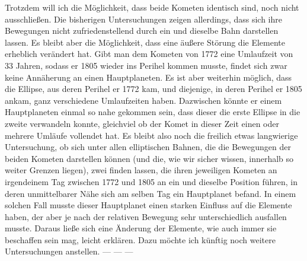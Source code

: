 \par\indent Trotzdem will ich die Möglichkeit, dass beide Kometen identisch sind, noch nicht ausschließen. Die bisherigen Untersuchungen zeigen allerdings, dass sich ihre Bewegungen nicht zufriedenstellend durch ein und dieselbe Bahn darstellen lassen. Es bleibt aber die Möglichkeit, dass eine äußere Störung die Elemente erheblich verändert hat. Gibt man dem Kometen von 1772 eine Umlaufzeit von 33 Jahren, sodass er 1805 wieder ins Perihel kommen musste, findet sich zwar keine Annäherung an einen Hauptplaneten. Es ist aber weiterhin möglich, dass die Ellipse, aus deren Perihel er 1772 kam, und diejenige, in deren Perihel er 1805 ankam, ganz verschiedene Umlaufzeiten haben. Dazwischen könnte er einem Hauptplaneten einmal so nahe gekommen sein, dass dieser die erste Ellipse in die zweite verwandeln konnte, gleichviel ob der Komet in dieser Zeit einen oder mehrere Umläufe vollendet hat. Es bleibt also noch die freilich etwas langwierige Untersuchung, ob sich unter allen elliptischen Bahnen, die die Bewegungen der beiden Kometen darstellen können (und die, wie wir sicher wissen, innerhalb so weiter Grenzen liegen), zwei finden lassen, die ihren jeweiligen Kometen an irgendeinem Tag zwischen 1772 und 1805 an ein und dieselbe Position führen, in deren unmittelbarer Nähe sich am selben Tag ein Hauptplanet befand. In einem solchen Fall musste dieser Hauptplanet einen starken
%
Einfluss auf die Elemente haben, der aber je nach der relativen Bewegung sehr unterschiedlich ausfallen musste. Daraus ließe sich eine Änderung der Elemente, wie auch immer sie beschaffen sein mag, leicht erklären. Dazu möchte ich künftig noch weitere Untersuchungen anstellen. --- --- ---